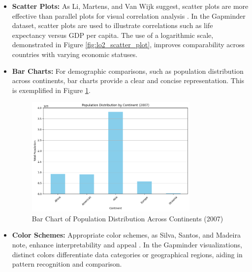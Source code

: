 \begin{itemize}
    \item \textbf{Scatter Plots:} As Li, Martens, and Van Wijk suggest, scatter plots are more effective than parallel plots for visual correlation analysis \cite{liJudgingCorrelationScatterplots2010}. In the Gapminder dataset, scatter plots are used to illustrate correlations such as life expectancy versus GDP per capita. The use of a logarithmic scale, demonstrated in Figure \ref{fig:lo2_scatter_plot}, improves comparability across countries with varying economic statuses.

    \item \textbf{Bar Charts:} For demographic comparisons, such as population distribution across continents, bar charts provide a clear and concise representation. This is exemplified in Figure \ref{fig:lo3_barchart}.

    \begin{figure}[h]
        \centering
        \includegraphics[width=0.8\textwidth]{images/plots/lo3_barplot.png} 
        \caption{Bar Chart of Population Distribution Across Continents (2007)}
        \label{fig:lo3_barchart}
    \end{figure}

    \item \textbf{Color Schemes:} Appropriate color schemes, as Silva, Santos, and Madeira note, enhance interpretability and appeal \cite{silvaUsingColorVisualization2011}. In the Gapminder visualizations, distinct colors differentiate data categories or geographical regions, aiding in pattern recognition and comparison.
    

\end{itemize}
